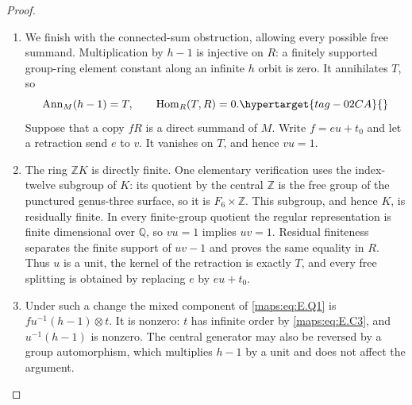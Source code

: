 \documentclass[11pt,a4paper]{article}
\numberwithin{equation}{section}
\theoremstyle{definition}
\begin{document}
\begin{proof}
\begin{enumerate}[label=\arabic*.,leftmargin=*]
\begin{equation}
\end{equation}
For clarity, before the last relation reductions its
$t$ coefficient for $E$ is
$-3h+4ha+4ha^2+h^2$, whose augmentation is six;
its free coefficient is $1-h$.  Its coefficient for $D$
is $2h^{-1}a^2-1-a$, which has augmentation zero and hence
annihilates the invariant generator $t$.  The other coordinates vanish. These identities follow by applying
the integral group-ring cancellations of \ref{maps:src:E.2.16} to
the displayed cusp-cycle columns.  Applying $\Gamma$ to \eqref{maps:eq:E.Q7} in \eqref{maps:eq:E.Q6} gives
\[
 -[(1-h)e+6t,t]
                =[e(h-1),t]-12q(t),
\]
as asserted.  In ordinary coinvariants $t=2v$ and
$E=12v$ for a primitive class $v$.  The quadratic image
is then $-48q(v)$, equal to the degree-two cup square evaluated
on the normalization.

\item We finish with the connected-sum obstruction, allowing
every possible free summand.  Multiplication by $h-1$
is injective on $R$: a finitely supported group-ring
element constant along an infinite $h$ orbit is zero.
It annihilates $T$, so
\begin{equation}
 \operatorname{Ann}_M(h-1)=T,
                       \qquad\operatorname{Hom}_R(T,R)=0.
 \hypertarget{tag-02CA}{}\label{maps:eq:E.Q8}
\end{equation}
Suppose that a copy $fR$ is a direct summand of $M$.
Write $f=eu+t_0$ and let a retraction send $e$ to $v$.
It vanishes on $T$, and hence $vu=1$.

\item The ring $\mathbb ZK$ is directly finite.  One elementary
verification uses the index-twelve subgroup of $K$:
its quotient by the central $\mathbb Z$ is the free group
of the punctured genus-three surface, so it is
$F_6\times\mathbb Z$.  This subgroup, and hence $K$, is
residually finite.  In every finite-group quotient the
regular representation is finite dimensional over
$\mathbb Q$, so $vu=1$ implies $uv=1$.  Residual
finiteness separates the finite support of $uv-1$ and
proves the same equality in $R$.  Thus $u$ is a unit,
the kernel of the retraction is exactly $T$, and every
free splitting is obtained by replacing $e$ by
$eu+t_0$.

\item Under such a change the mixed component of \eqref{maps:eq:E.Q1} is
$f u^{-1}(h-1)\otimes t$.  It is nonzero: $t$ has
infinite order by \eqref{maps:eq:E.C3}, and $u^{-1}(h-1)$ is nonzero.
The central generator may also be reversed by a group
automorphism, which multiplies $h-1$ by a unit and
does not affect the argument.


\end{enumerate}
\end{proof}
\end{document}
